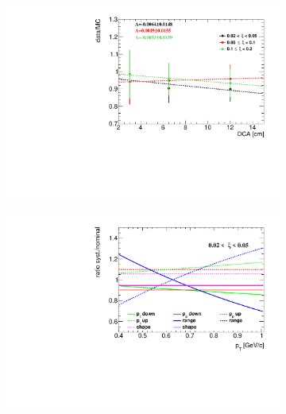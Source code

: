  \begin{figure}[t!]
 	\centering
 	\begin{subfigure}{.49\textwidth}
 		\includegraphics[width=\textwidth,page=1]{chapters/chrgSTAR/img/DCAproton/Ratio.pdf}
 	\end{subfigure}%
 	\begin{subfigure}{.49\textwidth}
 		\includegraphics[width=\textwidth,page=1]{chapters/chrgSTAR/img/DCAproton/p_bkg.pdf}
 	\end{subfigure}
 	\begin{subfigure}{.49\textwidth}

\end{subfigure}
\end{figure}
